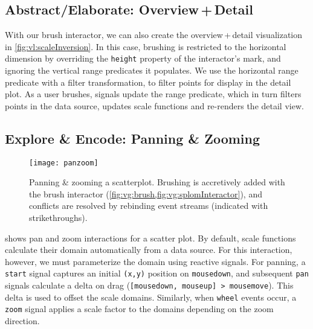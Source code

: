 \vspace{-10pt}

\subsection{Abstract/Elaborate: Overview\,+\,Detail}

\vspace{-7pt}

With our brush interactor, we can also create the overview\,+\,detail
visualization in \cref{fig:vl:scaleInversion}. In this case, brushing is
restricted to the horizontal dimension by overriding the \texttt{height}
property of the interactor's mark, and ignoring the vertical range predicates it
populates. We use the horizontal range predicate with a filter transformation,
to filter points for display in the detail plot. As a user brushes, signals
update the range predicate, which in turn filters points in the data source,
updates scale functions and re-renders the detail view.

\vspace{-10pt}

\subsection{Explore \& Encode: Panning \& Zooming}

\vspace{-7pt}

\begin{figure}[b!]
  \centering
  \texttt{[image: panzoom]}
  \caption{Panning \& zooming a scatterplot. Brushing is accretively added with
  the brush interactor (\cref{fig:vg:brush,fig:vg:splomInteractor}), and
  conflicts are resolved by rebinding event streams (indicated with
  strikethroughs).}
  \label{fig:vg:panzoom}
\end{figure}

 shows pan and zoom interactions for a scatter plot. By
default, scale functions calculate their domain automatically from a data
source. For this interaction, however, we must parameterize the domain using
reactive signals. For panning, a \texttt{start} signal captures an initial
\texttt{(x,y)} position on \texttt{mousedown}, and subsequent \texttt{pan}
signals calculate a delta on drag (\texttt{[mousedown, mouseup] > mousemove}).
This delta is used to offset the scale domains. Similarly, when \texttt{wheel}
events occur, a \texttt{zoom} signal applies a scale factor to the domains
depending on the zoom direction.

